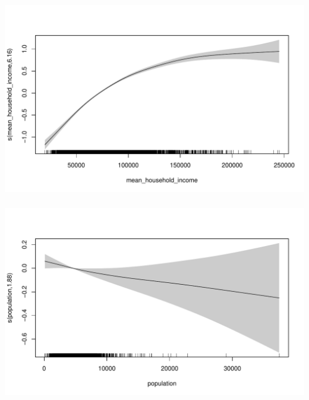 \documentclass[xetex,mathserif,serif,aspectratio=169]{beamer}
\begin{document}
\begin{frame}[fragile] \frametitle{} \oldB \small

\begin{center}
\includegraphics[width=\textwidth]{img/gamRug02.pdf}
\end{center}

\end{frame}

\begin{frame}[fragile] \frametitle{} \oldB \small

\begin{center}
\includegraphics[width=\textwidth]{img/gamRug03.pdf}
\end{center}

\end{frame}
\end{document}

